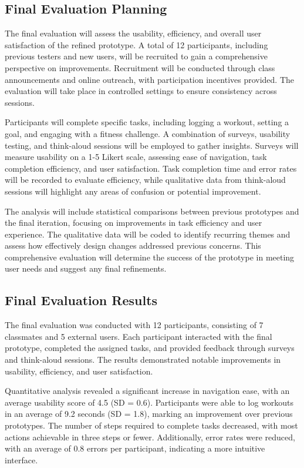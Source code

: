 \documentclass[
	letterpaper, %
]{jdf}
\begin{document}
\subsection{Final Evaluation Planning}
The final evaluation will assess the usability, efficiency, and overall user satisfaction of the refined prototype. A total of 12 participants, including previous testers and new users, will be recruited to gain a comprehensive perspective on improvements. Recruitment will be conducted through class announcements and online outreach, with participation incentives provided. The evaluation will take place in controlled settings to ensure consistency across sessions.

Participants will complete specific tasks, including logging a workout, setting a goal, and engaging with a fitness challenge. A combination of surveys, usability testing, and think-aloud sessions will be employed to gather insights. Surveys will measure usability on a 1-5 Likert scale, assessing ease of navigation, task completion efficiency, and user satisfaction. Task completion time and error rates will be recorded to evaluate efficiency, while qualitative data from think-aloud sessions will highlight any areas of confusion or potential improvement.

The analysis will include statistical comparisons between previous prototypes and the final iteration, focusing on improvements in task efficiency and user experience. The qualitative data will be coded to identify recurring themes and assess how effectively design changes addressed previous concerns. This comprehensive evaluation will determine the success of the prototype in meeting user needs and suggest any final refinements.

\subsection{Final Evaluation Results}
The final evaluation was conducted with 12 participants, consisting of 7 classmates and 5 external users. Each participant interacted with the final prototype, completed the assigned tasks, and provided feedback through surveys and think-aloud sessions. The results demonstrated notable improvements in usability, efficiency, and user satisfaction.

Quantitative analysis revealed a significant increase in navigation ease, with an average usability score of 4.5 (SD = 0.6). Participants were able to log workouts in an average of 9.2 seconds (SD = 1.8), marking an improvement over previous prototypes. The number of steps required to complete tasks decreased, with most actions achievable in three steps or fewer. Additionally, error rates were reduced, with an average of 0.8 errors per participant, indicating a more intuitive interface.
\end{document}
